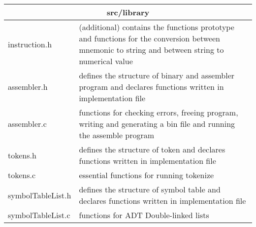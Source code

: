 \documentclass[9pt]{article}
\begin{document}
\medskip

\begin{tabular}{ |p{5cm}|p{10cm}|  }
\hline
\multicolumn{2}{|c|}{ src/library  } \\
\hline
instruction.h & (additional) contains the functions prototype and functions for the conversion between mnemonic to string and between string to numerical value \\
\hline
assembler.h & defines the structure of binary and assembler program and declares  functions written in implementation file\\
 \hline
assembler.c & functions for checking errors, freeing program, writing and generating a bin file and running the assemble program\\
\hline
tokens.h & defines the structure of token and declares  functions written in implementation file\\
\hline
tokens.c &  essential functions for running tokenize \ \\
\hline
symbolTableList.h & defines the structure of symbol table and declares  functions written in implementation file \\
\hline
symbolTableList.c &  functions for ADT Double-linked lists \\
\hline
\end{tabular}
\pagebreak
\end{document}
